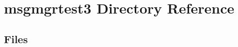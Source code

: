 \section{msgmgrtest3 Directory Reference}
\label{dir_7f9f47d90226f0046932f914083c1e3a}
\subsection*{Files}
\begin{DoxyCompactItemize}
\end{DoxyCompactItemize}

